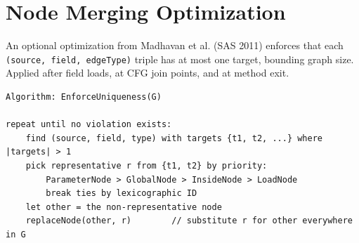 



\section{Node Merging Optimization}

An optional optimization from Madhavan et al. (SAS 2011) enforces that each \texttt{(source, field, edgeType)} triple has at most one target, bounding graph size. Applied after field loads, at CFG join points, and at method exit.

\begin{lstlisting}
Algorithm: EnforceUniqueness(G)

repeat until no violation exists:
    find (source, field, type) with targets {t1, t2, ...} where |targets| > 1
    pick representative r from {t1, t2} by priority:
        ParameterNode > GlobalNode > InsideNode > LoadNode
        break ties by lexicographic ID
    let other = the non-representative node
    replaceNode(other, r)        // substitute r for other everywhere in G
\end{lstlisting}


